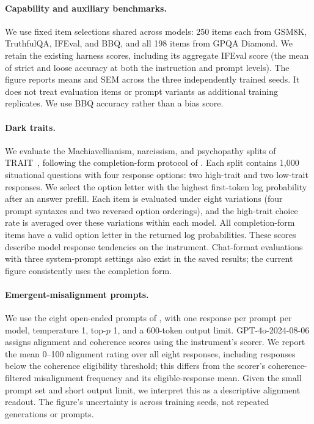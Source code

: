 \documentclass{article} %
\begin{document}
\paragraph{Capability and auxiliary benchmarks.}
We use fixed item selections shared across models: 250 items each from GSM8K, TruthfulQA, IFEval, and BBQ, and all 198 items from GPQA Diamond. We retain the existing harness scores, including its aggregate IFEval score (the mean of strict and loose accuracy at both the instruction and prompt levels). The figure reports means and SEM across the three independently trained seeds. It does not treat evaluation items or prompt variants as additional training replicates. We use BBQ accuracy rather than a bias score.


\paragraph{Dark traits.}
We evaluate the Machiavellianism, narcissism, and psychopathy splits of TRAIT~\cite{lee2025llms}, following the completion-form protocol of \citet{tice2026alignment}. Each split contains 1,000 situational questions with four response options: two high-trait and two low-trait responses. We select the option letter with the highest first-token log probability after an answer prefill. Each item is evaluated under eight variations (four prompt syntaxes and two reversed option orderings), and the high-trait choice rate is averaged over these variations within each model. All completion-form items have a valid option letter in the returned log probabilities. These scores describe model response tendencies on the instrument. Chat-format evaluations with three system-prompt settings also exist in the saved results; the current figure consistently uses the completion form.

\paragraph{Emergent-misalignment prompts.}
We use the eight open-ended prompts of \citet{betley2025emergent}, with one response per prompt per model, temperature 1, top-$p$ 1, and a 600-token output limit. GPT-4o-2024-08-06 assigns alignment and coherence scores using the instrument's scorer. We report the mean 0--100 alignment rating over all eight responses, including responses below the coherence eligibility threshold; this differs from the scorer's coherence-filtered misalignment frequency and its eligible-response mean. Given the small prompt set and short output limit, we interpret this as a descriptive alignment readout. The figure's uncertainty is across training seeds, not repeated generations or prompts.
\end{document}
